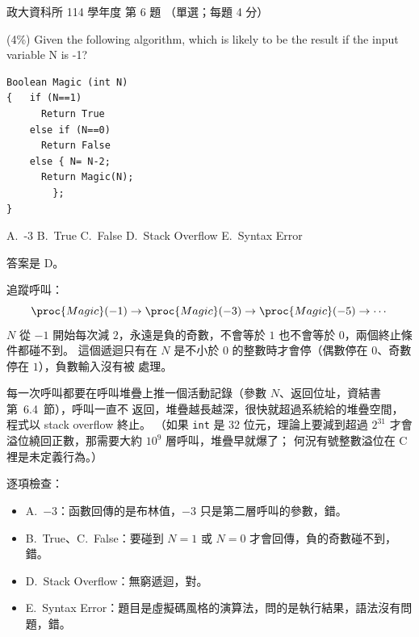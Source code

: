 \begin{pastexam}[label={px:nccu-114-dsa-06}]{政大資科所 114 學年度 第 6 題}
（單選；每題 4 分）

(4\%) Given the following algorithm, which is likely to be the result if the input variable N is
-1?
\begin{verbatim}
Boolean Magic (int N)
{   if (N==1)
      Return True
    else if (N==0)
      Return False
    else { N= N-2;
      Return Magic(N);
        };
}
\end{verbatim}
A.~-3 \qquad B.~True \qquad C.~False \qquad D.~Stack Overflow \qquad E.~Syntax Error
\end{pastexam}

\begin{pastsoln}
答案是 D。

追蹤呼叫：
\[
\proc{Magic}(-1) \to \proc{Magic}(-3) \to \proc{Magic}(-5) \to \cdots
\]
$N$ 從 $-1$ 開始每次減 $2$，永遠是負的奇數，不會等於 $1$ 也不會等於 $0$，兩個終止條件都碰不到。
這個遞迴只有在 $N$ 是不小於 $0$ 的整數時才會停（偶數停在 $0$、奇數停在 $1$），負數輸入沒有被
處理。

每一次呼叫都要在呼叫堆疊上推一個活動記錄（參數 $N$、返回位址，資結書第~6.4~節），呼叫一直不
返回，堆疊越長越深，很快就超過系統給的堆疊空間，程式以 stack overflow 終止。 （如果 \texttt{int}
是 32 位元，理論上要減到超過 $2^{31}$ 才會溢位繞回正數，那需要大約 $10^9$ 層呼叫，堆疊早就爆了；
何況有號整數溢位在 C 裡是未定義行為。）

逐項檢查：
\begin{itemize}
\item A.~$-3$：函數回傳的是布林值，$-3$ 只是第二層呼叫的參數，錯。
\item B.~True、C.~False：要碰到 $N = 1$ 或 $N = 0$ 才會回傳，負的奇數碰不到，錯。
\item D.~Stack Overflow：無窮遞迴，對。
\item E.~Syntax Error：題目是虛擬碼風格的演算法，問的是執行結果，語法沒有問題，錯。
\end{itemize}
\end{pastsoln}
